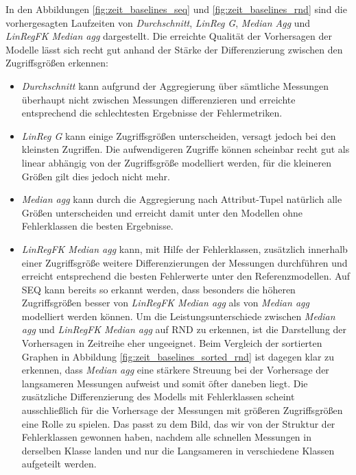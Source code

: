 \documentclass[
	12pt,
	a4paper,
	BCOR10mm,
	DIV14,
	listof=totoc,
	bibliography=totoc,
	headsepline
]{scrreprt}
\begin{document}
In den Abbildungen \ref{fig:zeit_baselines_seq} und \ref{fig:zeit_baselines_rnd} sind die vorhergesagten Laufzeiten von \textit{Durchschnitt}, \textit{LinReg G}, \textit{Median Agg} und \textit{LinRegFK Median agg} dargestellt.
Die erreichte Qualität der Vorhersagen der Modelle lässt sich recht gut anhand der Stärke der Differenzierung zwischen den Zugriffsgrößen erkennen:
\begin{itemize}
	\item \textit{Durchschnitt} kann aufgrund der Aggregierung über sämtliche Messungen überhaupt nicht zwischen Messungen differenzieren und erreichte entsprechend die schlechtesten Ergebnisse der Fehlermetriken.
	\item \textit{LinReg G} kann einige Zugriffsgrößen unterscheiden, versagt jedoch bei den kleinsten Zugriffen. Die aufwendigeren Zugriffe können scheinbar recht gut als linear abhängig von der Zugriffsgröße modelliert werden, für die kleineren Größen gilt dies jedoch nicht mehr.
	\item \textit{Median agg} kann durch die Aggregierung nach Attribut-Tupel natürlich alle Größen unterscheiden und erreicht damit unter den Modellen ohne Fehlerklassen die besten Ergebnisse. 
	\item \textit{LinRegFK Median agg} kann, mit Hilfe der Fehlerklassen, zusätzlich innerhalb einer Zugriffsgröße weitere Differenzierungen der Messungen durchführen und erreicht entsprechend die besten Fehlerwerte unter den Referenzmodellen.
	Auf SEQ kann bereits so erkannt werden, dass besonders die höheren Zugriffsgrößen besser von \textit{LinRegFK Median agg} als von \textit{Median agg} modelliert werden können.
	Um die Leistungsunterschiede zwischen \textit{Median agg} und \textit{LinRegFK Median agg} auf RND zu erkennen, ist die Darstellung der Vorhersagen in Zeitreihe eher ungeeignet.
	Beim Vergleich der sortierten Graphen in Abbildung \ref{fig:zeit_baselines_sorted_rnd} ist dagegen klar zu erkennen, dass \textit{Median agg} eine stärkere Streuung bei der Vorhersage der langsameren Messungen aufweist und somit öfter daneben liegt.
	Die zusätzliche Differenzierung des Modells mit Fehlerklassen scheint ausschließlich für die Vorhersage der Messungen mit größeren Zugriffsgrößen eine Rolle zu spielen.
	Das passt zu dem Bild, das wir von der Struktur der Fehlerklassen gewonnen haben, nachdem alle schnellen Messungen in derselben Klasse landen und nur die Langsameren in verschiedene Klassen aufgeteilt werden.
\end{itemize}
\end{document}
